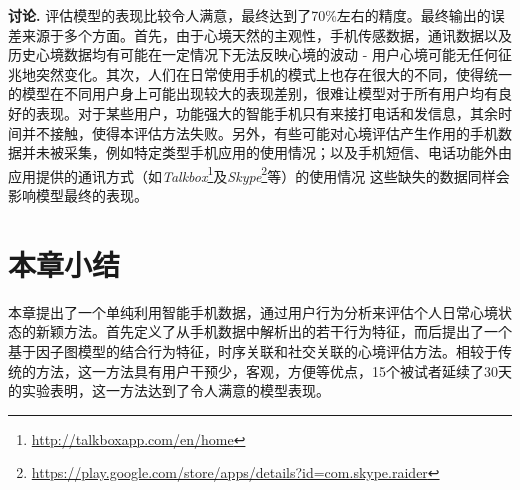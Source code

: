 \textbf{讨论.} 
评估模型的表现比较令人满意，最终达到了70\%左右的精度。最终输出的误差来源于多个方面。首先，由于心境天然的主观性，手机传感数据，通讯数据以及历史心境数据均有可能在一定情况下无法反映心境的波动 - 用户心境可能无任何征兆地突然变化。其次，人们在日常使用手机的模式上也存在很大的不同，使得统一的模型在不同用户身上可能出现较大的表现差别，很难让模型对于所有用户均有良好的表现。对于某些用户，功能强大的智能手机只有来接打电话和发信息，其余时间并不接触，使得本评估方法失败。另外，有些可能对心境评估产生作用的手机数据并未被采集，例如特定类型手机应用的使用情况；以及手机短信、电话功能外由应用提供的通讯方式（如\textit{Talkbox}\footnote{\url{http://talkboxapp.com/en/home}}及\textit{Skype}\footnote{\url{https://play.google.com/store/apps/details?id=com.skype.raider}}等）的使用情况
这些缺失的数据同样会影响模型最终的表现。


\section{本章小结}\label{mood:conclusion}

本章提出了一个单纯利用智能手机数据，通过用户行为分析来评估个人日常心境状态的新颖方法。首先定义了从手机数据中解析出的若干行为特征，而后提出了一个基于因子图模型的结合行为特征，时序关联和社交关联的心境评估方法。相较于传统的方法，这一方法具有用户干预少，客观，方便等优点，15个被试者延续了30天的实验表明，这一方法达到了令人满意的模型表现。
 










